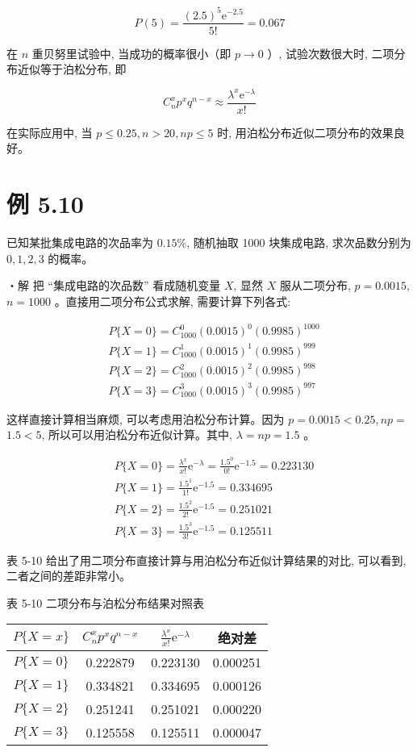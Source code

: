 \documentclass[10pt]{article}
\begin{document}
\begin{CJK*}{UTF8}{bsmi}
$$
P(5)=\frac{(2.5)^{5} \mathrm{e}^{-2.5}}{5 !}=0.067
$$

在 $n$ 重贝努里试验中, 当成功的概率很小（即 $p \rightarrow 0$ ）, 试验次数很大时, 二项分布近似等于泊松分布, 即

$$
C_{n}^{x} p^{x} q^{n-x} \approx \frac{\lambda^{x} \mathrm{e}^{-\lambda}}{x !}
$$

在实际应用中, 当 $p \leqslant 0.25, n>20, n p \leqslant 5$ 时, 用泊松分布近似二项分布的效果良好。

\section*{例 5.10}
已知某批集成电路的次品率为 $0.15 \%$, 随机抽取 1000 块集成电路, 求次品数分别为 $0,1,2,3$ 的概率。

・解 把 “集成电路的次品数” 看成随机变量 $X$, 显然 $X$ 服从二项分布, $p=0.0015$, $n=1000$ 。直接用二项分布公式求解, 需要计算下列各式:

$$
\begin{aligned}
& P\{X=0\}=C_{1000}^{0}(0.0015)^{0}(0.9985)^{1000} \\
& P\{X=1\}=C_{1000}^{1}(0.0015)^{1}(0.9985)^{999} \\
& P\{X=2\}=C_{1000}^{2}(0.0015)^{2}(0.9985)^{998} \\
& P\{X=3\}=C_{1000}^{3}(0.0015)^{3}(0.9985)^{997}
\end{aligned}
$$

这样直接计算相当麻烦, 可以考虑用泊松分布计算。因为 $p=0.0015<0.25, n p=$ $1.5<5$, 所以可以用泊松分布近似计算。其中, $\lambda=n p=1.5$ 。

$$
\begin{aligned}
& P\{X=0\}=\frac{\lambda^{x}}{x !} \mathrm{e}^{-\lambda}=\frac{1.5^{0}}{0 !} \mathrm{e}^{-1.5}=0.223130 \\
& P\{X=1\}=\frac{1.5^{1}}{1 !} \mathrm{e}^{-1.5}=0.334695 \\
& P\{X=2\}=\frac{1.5^{2}}{2 !} \mathrm{e}^{-1.5}=0.251021 \\
& P\{X=3\}=\frac{1.5^{3}}{3 !} \mathrm{e}^{-1.5}=0.125511
\end{aligned}
$$

表 5-10 给出了用二项分布直接计算与用泊松分布近似计算结果的对比, 可以看到,二者之间的差距非常小。

表 5-10 二项分布与泊松分布结果对照表

\begin{center}
\begin{tabular}{cccc}
\hline
$P\{X=x\}$ & $C_{n}^{x} p^{x} q^{n-x}$ & $\frac{\lambda^{x}}{x !} \mathrm{e}^{-\lambda}$ & 绝对差 \\
\hline
$P\{X=0\}$ & 0.222879 & 0.223130 & 0.000251 \\
$P\{X=1\}$ & 0.334821 & 0.334695 & 0.000126 \\
$P\{X=2\}$ & 0.251241 & 0.251021 & 0.000220 \\
$P\{X=3\}$ & 0.125558 & 0.125511 & 0.000047 \\
\hline
\end{tabular}
\end{center}


\end{CJK*}
\end{document}
